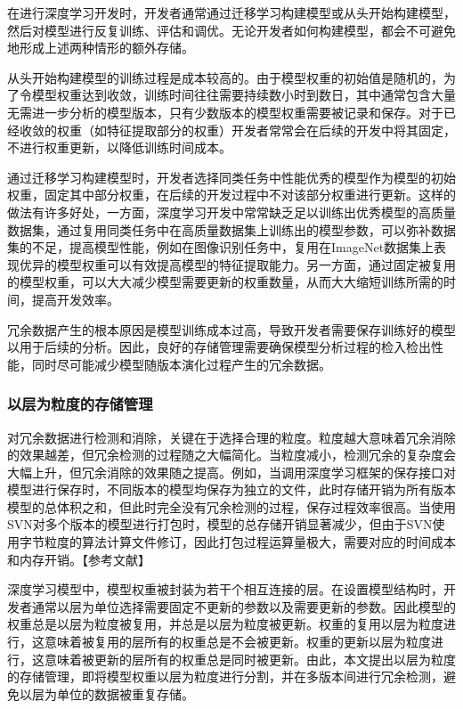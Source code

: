 \documentclass{cjc}
\begin{document}
在进行深度学习开发时，开发者通常通过迁移学习构建模型或从头开始构建模型，然后对模型进行反复训练、评估和调优。无论开发者如何构建模型，都会不可避免地形成上述两种情形的额外存储。

从头开始构建模型的训练过程是成本较高的。由于模型权重的初始值是随机的，为了令模型权重达到收敛，训练时间往往需要持续数小时到数日，其中通常包含大量无需进一步分析的模型版本，只有少数版本的模型权重需要被记录和保存。对于已经收敛的权重（如特征提取部分的权重）开发者常常会在后续的开发中将其固定，不进行权重更新，以降低训练时间成本。

通过迁移学习构建模型时，开发者选择同类任务中性能优秀的模型作为模型的初始权重，固定其中部分权重，在后续的开发过程中不对该部分权重进行更新。这样的做法有许多好处，一方面，深度学习开发中常常缺乏足以训练出优秀模型的高质量数据集，通过复用同类任务中在高质量数据集上训练出的模型参数，可以弥补数据集的不足，提高模型性能，例如在图像识别任务中，复用在ImageNet数据集上表现优异的模型权重可以有效提高模型的特征提取能力。另一方面，通过固定被复用的模型权重，可以大大减少模型需要更新的权重数量，从而大大缩短训练所需的时间，提高开发效率。

冗余数据产生的根本原因是模型训练成本过高，导致开发者需要保存训练好的模型以用于后续的分析。因此，良好的存储管理需要确保模型分析过程的检入检出性能，同时尽可能减少模型随版本演化过程产生的冗余数据。

\subsubsection{以层为粒度的存储管理}
对冗余数据进行检测和消除，关键在于选择合理的粒度。粒度越大意味着冗余消除的效果越差，但冗余检测的过程随之大幅简化。当粒度减小，检测冗余的复杂度会大幅上升，但冗余消除的效果随之提高。例如，当调用深度学习框架的保存接口对模型进行保存时，不同版本的模型均保存为独立的文件，此时存储开销为所有版本模型的总体积之和，但此时完全没有冗余检测的过程，保存过程效率很高。当使用SVN对多个版本的模型进行打包时，模型的总存储开销显著减少，但由于SVN使用字节粒度的算法计算文件修订，因此打包过程运算量极大，需要对应的时间成本和内存开销。【参考文献】

深度学习模型中，模型权重被封装为若干个相互连接的层。在设置模型结构时，开发者通常以层为单位选择需要固定不更新的参数以及需要更新的参数。因此模型的权重总是以层为粒度被复用，并总是以层为粒度被更新。权重的复用以层为粒度进行，这意味着被复用的层所有的权重总是不会被更新。权重的更新以层为粒度进行，这意味着被更新的层所有的权重总是同时被更新。由此，本文提出以层为粒度的存储管理，即将模型权重以层为粒度进行分割，并在多版本间进行冗余检测，避免以层为单位的数据被重复存储。
\end{document}
